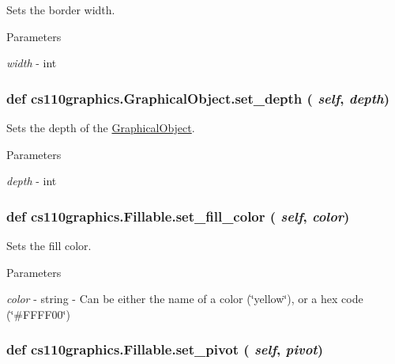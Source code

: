 Sets the border width. 
\begin{DoxyParams}{Parameters}
\item[{\em width}]-\/ int \end{DoxyParams}
\hypertarget{classcs110graphics_1_1GraphicalObject_a20d76d4ee4419c3065d61deb6cbc6700}{
\subsubsection[{set\_\-depth}]{\setlength{\rightskip}{0pt plus 5cm}def cs110graphics.GraphicalObject.set\_\-depth ( {\em self}, \/   {\em depth})}}
\label{classcs110graphics_1_1GraphicalObject_a20d76d4ee4419c3065d61deb6cbc6700}


Sets the depth of the \hyperlink{classcs110graphics_1_1GraphicalObject}{GraphicalObject}. 
\begin{DoxyParams}{Parameters}
\item[{\em depth}]-\/ int \end{DoxyParams}
\hypertarget{classcs110graphics_1_1Fillable_a4f24c7186c8d057e42a0209eb1d56be7}{
\subsubsection[{set\_\-fill\_\-color}]{\setlength{\rightskip}{0pt plus 5cm}def cs110graphics.Fillable.set\_\-fill\_\-color ( {\em self}, \/   {\em color})}}
\label{classcs110graphics_1_1Fillable_a4f24c7186c8d057e42a0209eb1d56be7}


Sets the fill color. 
\begin{DoxyParams}{Parameters}
\item[{\em color}]-\/ string -\/ Can be either the name of a color (\char`\"{}yellow\char`\"{}), or a hex code (\char`\"{}\#FFFF00\char`\"{}) \end{DoxyParams}
\hypertarget{classcs110graphics_1_1Fillable_a2a6066d1a11c0854ff5ee85e7d9ceb54}{
\subsubsection[{set\_\-pivot}]{\setlength{\rightskip}{0pt plus 5cm}def cs110graphics.Fillable.set\_\-pivot ( {\em self}, \/   {\em pivot})}}
\label{classcs110graphics_1_1Fillable_a2a6066d1a11c0854ff5ee85e7d9ceb54}


